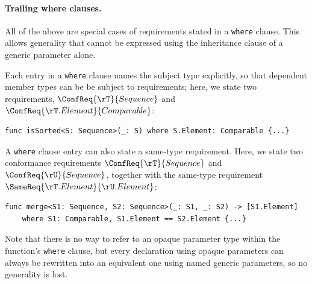 \documentclass[../generics]{subfiles}
\begin{document}
\paragraph{Trailing where clauses.} All of the above are special cases of requirements stated in a \texttt{where} clause. This allows generality that cannot be expressed using the inheritance clause of a generic parameter alone.

Each entry in a \texttt{where} clause names the subject type explicitly, so that dependent member types can be be subject to requirements; here, we state two requirements, $\ConfReq{\rT}{Sequence}$ and $\ConfReq{\rT.Element}{Comparable}$:
\begin{Verbatim}
func isSorted<S: Sequence>(_: S) where S.Element: Comparable {...}
\end{Verbatim}

A \texttt{where} clause entry can also state a same-type requirement. Here, we state two conformance requirements $\ConfReq{\rT}{Sequence}$ and $\ConfReq{\rU}{Sequence}$, together with the same-type requirement $\SameReq{\rT.Element}{\rU.Element}$:
\begin{Verbatim}
func merge<S1: Sequence, S2: Sequence>(_: S1, _: S2) -> [S1.Element]
    where S1: Comparable, S1.Element == S2.Element {...}
\end{Verbatim}

Note that there is no way to refer to an opaque parameter type within the function's \texttt{where} clause, but every declaration using opaque parameters can always be rewritten into an equivalent one using named generic parameters, so no generality is lost.
\end{document}
